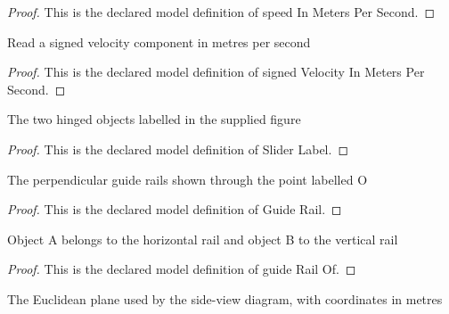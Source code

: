 \begin{proof}
  This is the declared model definition of speed In Meters Per Second.
\end{proof}
\begin{definition}
  \label{def:physics:phyx-mini-0673:phyxminiproblems-problemphyxmini0673-signedvelocityinmeterspersecond}
  Read a signed velocity component in metres per second
\end{definition}
\begin{proof}
  This is the declared model definition of signed Velocity In Meters Per Second.
\end{proof}
\begin{definition}
  \label{def:physics:phyx-mini-0673:phyxminiproblems-problemphyxmini0673-sliderlabel}
  The two hinged objects labelled in the supplied figure
\end{definition}
\begin{proof}
  This is the declared model definition of Slider Label.
\end{proof}
\begin{definition}
  \label{def:physics:phyx-mini-0673:phyxminiproblems-problemphyxmini0673-guiderail}
  The perpendicular guide rails shown through the point labelled O
\end{definition}
\begin{proof}
  This is the declared model definition of Guide Rail.
\end{proof}
\begin{definition}
  \label{def:physics:phyx-mini-0673:phyxminiproblems-problemphyxmini0673-guiderailof}
  Object A belongs to the horizontal rail and object B to the vertical rail
\end{definition}
\begin{proof}
  This is the declared model definition of guide Rail Of.
\end{proof}
\begin{definition}
  \label{def:physics:phyx-mini-0673:phyxminiproblems-problemphyxmini0673-diagramplane}
  The Euclidean plane used by the side-view diagram, with coordinates in metres
\end{definition}
